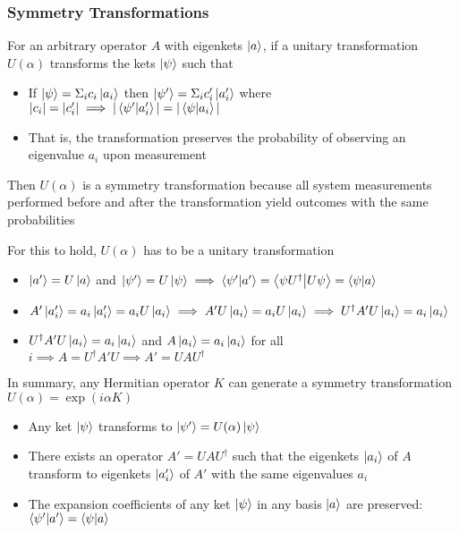 \documentclass[8pt,t,mathserif,aspectratio=169]{beamer}
\begin{document}
\begin{frame}
  \frametitle{Symmetry Transformations}
  \vspace{1mm}
  For an arbitrary operator $A$ with eigenkets $\ket{a}$, if a unitary transformation $U(\alpha)$ transforms the kets $\ket{\psi}$ such that
  \begin{itemize}
    \item If $\ket{\psi} = \Sigma_i c_i \ket{a_i}$ then $\ket{\psi'} = \Sigma_i c_i' \ket{a_i'}$ where $|c_i| = |c_i'| \implies |\braket{\psi'}{a_i'}| = |\braket{\psi}{a_i}|$ 
    \item That is, the transformation preserves the probability of observing an eigenvalue $a_i$ upon measurement
  \end{itemize}
  Then $U(\alpha)$ is a symmetry transformation because all system measurements performed before and after the transformation yield outcomes with the same probabilities

  For this to hold, $U(\alpha)$ has to be a unitary transformation
  \begin{itemize}
    \item $\ket{a'} = U \ket{a}$ and $\ket{\psi'} = U \ket{\psi} \implies \braket{\psi'}{a'} = \bra{\psi U^{\dagger}}\ket{U \psi} = \braket{\psi}{a}$
    \item $A' \ket{a_i'} = a_i \ket{a_i'} = a_i U \ket{a_i} \implies A' U \ket{a_i} = a_i U \ket{a_i} \implies U^{\dagger} A' U \ket{a_i} = a_i \ket{a_i}$
    \item $U^{\dagger} A' U \ket{a_i} = a_i \ket{a_i}$ and $A \ket{a_i} = a_i \ket{a_i}$ for all $i \implies A = U^{\dagger} A' U \implies A' = U A U^{\dagger}$ 
  \end{itemize}

  In summary, any Hermitian operator $K$ can generate a symmetry transformation $U(\alpha) = \exp(i \alpha K)$
  \begin{itemize}
    \item Any ket $\ket{\psi}$ transforms to $\ket{\psi'} = U(\alpha) \ket{\psi}$
    \item There exists an operator $A' = U A U^{\dagger}$ such that the eigenkets $\ket{a_i}$ of $A$ transform to eigenkets $\ket{a'_i}$ of $A'$ with the same eigenvalues $a_i$
    \item The expansion coefficients of any ket $\ket{\psi}$ in any basis $\ket{a}$ are preserved: $\braket{\psi'}{a'} = \braket{\psi}{a}$
  \end{itemize}
\end{frame}
\end{document}

